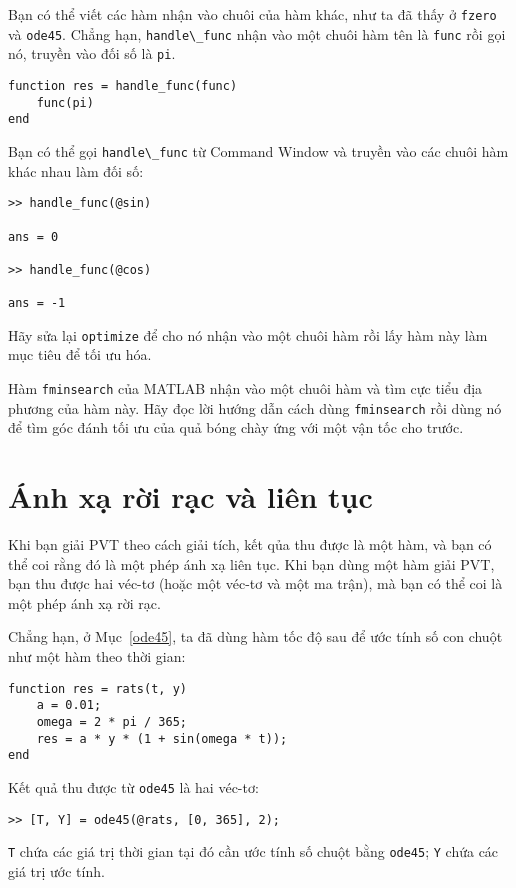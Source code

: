 \documentclass[12pt]{book}
\begin{document}
\begin{ex}
Bạn có thể viết các hàm nhận vào chuôi của hàm khác, như ta đã thấy  
ở {\tt fzero} và {\tt ode45}. Chẳng hạn, \verb#handle\_func# nhận vào 
một chuôi hàm tên là {\tt func} rồi gọi nó, truyền vào đối số là  {\tt pi}.

\begin{verbatim}
function res = handle_func(func)
    func(pi)
end
\end{verbatim}
%
Bạn có thể gọi \verb#handle\_func# từ  Command Window và truyền
vào các chuôi  hàm khác nhau làm đối số:

\begin{verbatim}
>> handle_func(@sin)

ans = 0

>> handle_func(@cos)

ans = -1
\end{verbatim}
%
Hãy sửa lại  {\tt optimize} để cho nó nhận vào một chuôi hàm rồi 
lấy hàm này làm mục tiêu để tối ưu hóa.
\end{ex}

\begin{ex}
Hàm  {\tt fminsearch} của MATLAB nhận vào một chuôi hàm và tìm 
cực tiểu địa phương của hàm này. Hãy đọc lời hướng dẫn cách dùng  
{\tt fminsearch} rồi dùng nó để tìm góc đánh tối ưu của quả bóng 
chày ứng với một  vận tốc cho trước. 
\end{ex}


\section{Ánh xạ rời rạc và liên tục }

Khi bạn giải PVT theo cách giải tích, kết qủa thu được là một hàm, 
và bạn có thể coi rằng đó là một phép ánh xạ liên tục. Khi bạn 
dùng một hàm giải PVT, bạn thu được hai véc-tơ (hoặc một véc-tơ 
và một ma trận), mà bạn có thể coi là một phép ánh xạ rời rạc.

Chẳng hạn, ở Mục~\ref{ode45}, ta đã dùng hàm tốc độ sau để 
ước tính số con chuột như một hàm theo thời gian: 

\begin{verbatim}
function res = rats(t, y)
    a = 0.01;
    omega = 2 * pi / 365;
    res = a * y * (1 + sin(omega * t));
end
\end{verbatim}
%
Kết quả thu được từ  {\tt ode45} là hai véc-tơ:

\begin{verbatim}
>> [T, Y] = ode45(@rats, [0, 365], 2);
\end{verbatim}
%
{\tt T} chứa các giá trị thời gian tại đó cần ước tính số chuột bằng {\tt ode45}; 
{\tt Y} chứa các giá trị ước tính.
\end{document}
